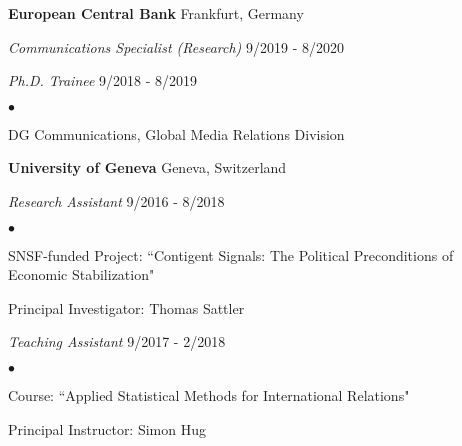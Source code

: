 \documentclass[margin, line]{res}
\newenvironment{list1}{
 \begin{list}{\ding{113}}{%
  \setlength{\itemsep}{0in}
  \setlength{\parsep}{0in} \setlength{\parskip}{0in}
  \setlength{\topsep}{0in} \setlength{\partopsep}{0in} 
  \setlength{\leftmargin}{0.17in}}}{\end{list}}
\newenvironment{list2}{
 \begin{list}{$\bullet$}{%
  \setlength{\itemsep}{0in}
  \setlength{\parsep}{0in} \setlength{\parskip}{0in}
  \setlength{\topsep}{0in} \setlength{\partopsep}{0in} 
  \setlength{\leftmargin}{0.2in}}}{\end{list}}
\begin{document}
\begin{resume}
\textbf{European Central Bank} \hfill Frankfurt, Germany \\
\vspace*{-.12in}
\begin{list1}
\item[] \textit{Communications Specialist (Research)} \hfill 9/2019 - 8/2020 \\[-2ex]
\item[] \textit{Ph.D. Trainee} \hfill 9/2018 - 8/2019\\[-2.5ex]
\begin{list2}
\vspace*{.04in}
\item[] DG Communications, Global Media Relations Division 
\end{list2}
\end{list1}

\textbf{University of Geneva} \hfill Geneva, Switzerland \\
\vspace*{-.12in}
\begin{list1}
\item[] \textit{Research Assistant} \hfill 9/2016 - 8/2018 \\[-2.5ex]
\begin{list2}
\vspace*{.04in}
\item[] SNSF-funded Project: ``Contigent Signals: The Political Preconditions of \\Economic Stabilization"
\vspace*{.04in}
\item[] Principal Investigator: Thomas Sattler
\end{list2}
\vspace*{.08in}
\item[] \textit{Teaching Assistant} \hfill 9/2017 - 2/2018\\[-2.5ex]
\begin{list2}
\vspace*{.04in}
\item[] Course: ``Applied Statistical Methods for International Relations"
\vspace*{.04in}
\item[] Principal Instructor: Simon Hug
\end{list2}
\end{list1}


\end{resume}
\end{document}
